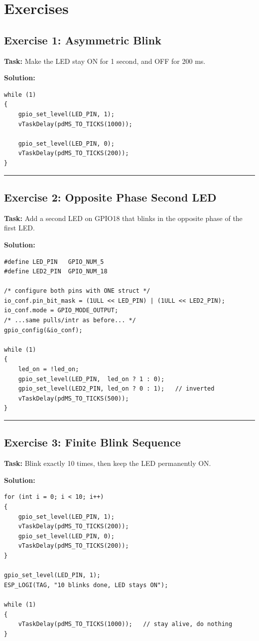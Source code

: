 \documentclass[11pt]{article}
\begin{document}
\section*{Exercises}

\subsection*{Exercise 1: Asymmetric Blink}
\textbf{Task:} Make the LED stay ON for 1 second, and OFF for 200 ms.

\textbf{Solution:}
\begin{verbatim}
while (1)
{
    gpio_set_level(LED_PIN, 1);
    vTaskDelay(pdMS_TO_TICKS(1000));

    gpio_set_level(LED_PIN, 0);
    vTaskDelay(pdMS_TO_TICKS(200));
}
\end{verbatim}

\bigskip
\noindent\rule{\textwidth}{0.4pt}
\bigskip

\subsection*{Exercise 2: Opposite Phase Second LED}
\textbf{Task:} Add a second LED on GPIO18 that blinks in the opposite phase of the first LED.

\textbf{Solution:}
\begin{verbatim}
#define LED_PIN   GPIO_NUM_5
#define LED2_PIN  GPIO_NUM_18

/* configure both pins with ONE struct */
io_conf.pin_bit_mask = (1ULL << LED_PIN) | (1ULL << LED2_PIN);
io_conf.mode = GPIO_MODE_OUTPUT;
/* ...same pulls/intr as before... */
gpio_config(&io_conf);

while (1)
{
    led_on = !led_on;
    gpio_set_level(LED_PIN,  led_on ? 1 : 0);
    gpio_set_level(LED2_PIN, led_on ? 0 : 1);   // inverted
    vTaskDelay(pdMS_TO_TICKS(500));
}
\end{verbatim}

\bigskip
\noindent\rule{\textwidth}{0.4pt}
\bigskip

\subsection*{Exercise 3: Finite Blink Sequence}
\textbf{Task:} Blink exactly 10 times, then keep the LED permanently ON.

\textbf{Solution:}
\begin{verbatim}
for (int i = 0; i < 10; i++)
{
    gpio_set_level(LED_PIN, 1);
    vTaskDelay(pdMS_TO_TICKS(200));
    gpio_set_level(LED_PIN, 0);
    vTaskDelay(pdMS_TO_TICKS(200));
}

gpio_set_level(LED_PIN, 1);
ESP_LOGI(TAG, "10 blinks done, LED stays ON");

while (1)
{
    vTaskDelay(pdMS_TO_TICKS(1000));   // stay alive, do nothing
}
\end{verbatim}
\end{document}
